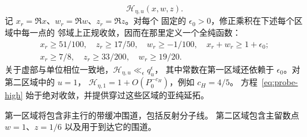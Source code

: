\begin{lemma}[完备局部恒等式]
\begin{equation}
 \mathcal H_{\eta,u}(x,w,z).
\end{equation}
记 $x_r=\Re x$、$w_r=\Re w$、$z_r=\Re z$。对每个
固定的 $\epsilon_0>0$，修正乘积在下述每个区域中每一点的
邻域上正规收敛，因而在那里定义一个全纯函数：
\begin{align}
 x_r\ge51/100,\quad z_r\ge17/50,\quad w_r\ge-1/100,\quad
 x_r+w_r\ge1+\epsilon_0;\label{eq:local-region-one}\\
 x_r\ge7/8,\quad z_r\ge33/200,\quad w_r\ge19/20.
 \label{eq:local-region-two}
\end{align}
关于虚部与单位相位一致地，$\mathcal H_{\eta,u}\ll_\epsilon q_u^\epsilon$，
其中常数在第一区域还依赖于 $\epsilon_0$。对第二区域中的 $u=1$，
$\mathcal H_{\eta,1}=1+O(P_0^{-c_H})$，例如 $c_H=4/5$。
方程~\eqref{eq:probe-high} 始于绝对收敛，并提供穿过这些区域的亚纯延拓。
\end{lemma}

第一区域将包含非主行的带缓冲围道，包括反射分子线。
第二区域包含主留数点 $w=1$、$z=1/6$ 以及用于到达它的围道。

